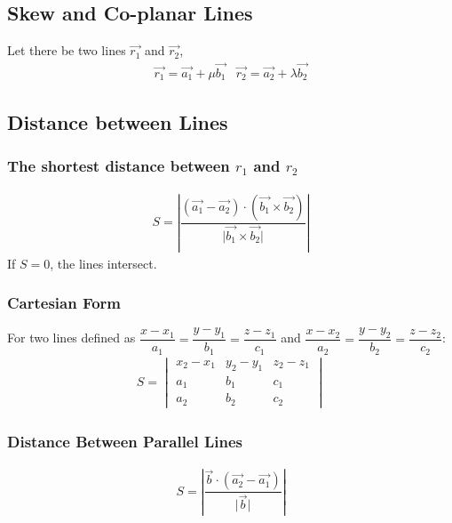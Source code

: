 \documentclass[../main.tex]{subfile}
\begin{document}
    \subsection{Skew and Co-planar Lines}
    Let there be two lines $\vec{r_1}$ and $\vec{r_2}$,
    \begin{align}
        \vec{r_1}=\vec{a_1}+\mu \vec{b_1} & \vec{r_2}=\vec{a_2}+\lambda \vec{b_2}
    \end{align}

    \subsection{Distance between Lines}
    \subsubsection{The shortest distance between $r_1$ and $r_2$}
    \begin{align}
        S=\left\lvert \dfrac{(\vec{a_1}-\vec{a_2})\cdot (\vec{b_1}\times\vec{b_2})}{\lvert \vec{b_1}\times\vec{b_2} \rvert}\right\rvert
    \end{align}
    If $S=0$, the lines intersect.

    \subsubsection{Cartesian Form}
    For two lines defined as $\dfrac{x-x_1}{a_1}=\dfrac{y-y_1}{b_1}=\dfrac{z-z_1}{c_1}$ and $\dfrac{x-x_2}{a_2}=\dfrac{y-y_2}{b_2}=\dfrac{z-z_2}{c_2}$:
    \begin{align}
    S=
        \begin{vmatrix}
        x_2-x_1&y_2-y_1&z_2-z_1\\
        a_1&b_1&c_1\\
        a_2&b_2&c_2
        \end{vmatrix}
    \end{align}

    \subsubsection{Distance Between Parallel Lines}
    \begin{align}
        S=\left| \dfrac{\vec{b}\cdot(\vec{a_2}-\vec{a_1})}{\lvert \vec{b} \rvert} \right|
    \end{align}
\end{document}
